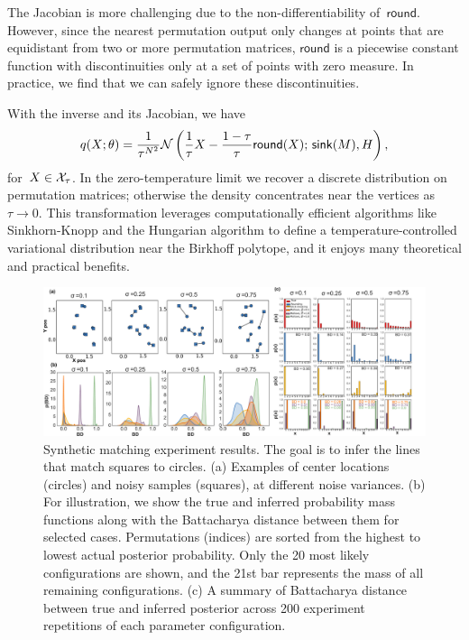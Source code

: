 \documentclass[twoside]{article}
\begin{document}
The Jacobian is more challenging due to the non-differentiability
of~$\mathsf{round}$. However, since the nearest permutation output
only changes at points that are equidistant from two or more
permutation matrices, $\mathsf{round}$ is a piecewise constant
function with discontinuities only at a set of points with
zero measure. In practice, we find that we can safely ignore these
discontinuities.

With the inverse and its Jacobian, we have
\begin{align*}
  q(X; \theta) = 
  \frac{1}{\tau^{N^2}} \mathcal{N} \left( \frac{1}{\tau}X -\frac{1-\tau}{\tau} \mathsf{round}(X); \, \mathsf{sink}(M), H \right),
\end{align*}
for~${X \in \mathcal{X}_\tau}$.
In the zero-temperature limit we recover a discrete
distribution on permutation matrices; otherwise the density
concentrates near the vertices as~${\tau \to 0}$.  This
transformation leverages computationally efficient algorithms
like Sinkhorn-Knopp and the Hungarian algorithm to define a
temperature-controlled variational distribution near the
Birkhoff polytope, and it enjoys many theoretical and practical
benefits.

\begin{figure}[ht] 
   \centering
   \includegraphics[width=6in]{../figures/figure8.pdf}
   \caption{Synthetic matching experiment results. The goal is to
     infer the lines that match squares to circles. (a) Examples of
     center locations (circles) and noisy samples (squares), at
     different noise variances. (b) For illustration, we show the true
     and inferred probability mass functions along with the
     Battacharya distance between them for selected
     cases. Permutations (indices) are sorted from the highest to
     lowest actual posterior probability. Only the 20 most likely
     configurations are shown, and the 21st bar represents the mass of
     all remaining configurations. (c) A summary of Battacharya
     distance between true and inferred posterior across 200
     experiment repetitions of each parameter configuration.}
   \label{fig:synthetic}
\end{figure}
\end{document}
